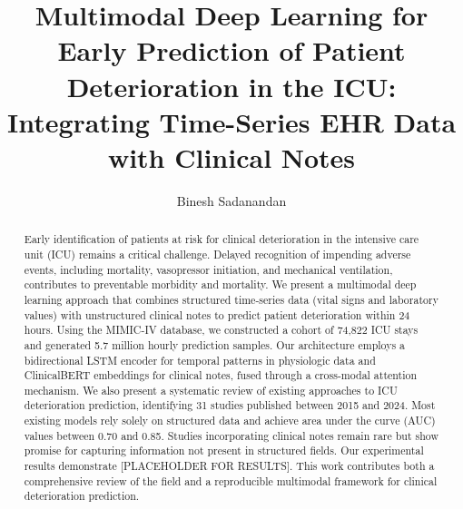 \documentclass[11pt]{article}
\title{Multimodal Deep Learning for Early Prediction of Patient Deterioration in the ICU:\\ Integrating Time-Series EHR Data with Clinical Notes}
\author{Binesh Sadanandan}
\date{}
\begin{document}
\maketitle

\begin{abstract}
Early identification of patients at risk for clinical deterioration in the intensive care unit (ICU) remains a critical challenge. Delayed recognition of impending adverse events, including mortality, vasopressor initiation, and mechanical ventilation, contributes to preventable morbidity and mortality. We present a multimodal deep learning approach that combines structured time-series data (vital signs and laboratory values) with unstructured clinical notes to predict patient deterioration within 24 hours. Using the MIMIC-IV database, we constructed a cohort of 74,822 ICU stays and generated 5.7 million hourly prediction samples. Our architecture employs a bidirectional LSTM encoder for temporal patterns in physiologic data and ClinicalBERT embeddings for clinical notes, fused through a cross-modal attention mechanism. We also present a systematic review of existing approaches to ICU deterioration prediction, identifying 31 studies published between 2015 and 2024. Most existing models rely solely on structured data and achieve area under the curve (AUC) values between 0.70 and 0.85. Studies incorporating clinical notes remain rare but show promise for capturing information not present in structured fields. Our experimental results demonstrate [PLACEHOLDER FOR RESULTS]. This work contributes both a comprehensive review of the field and a reproducible multimodal framework for clinical deterioration prediction.
\end{abstract}








\clearpage


\clearpage
\appendix

\end{document}
